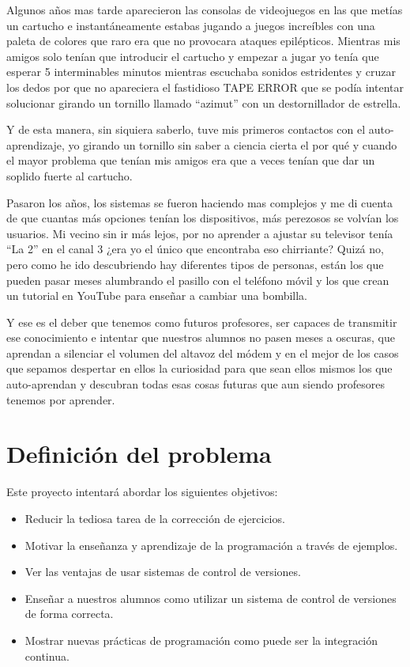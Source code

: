 \bigskip
Algunos años mas tarde aparecieron las consolas de videojuegos en las que metías un cartucho e instantáneamente estabas jugando a juegos increíbles con una paleta de colores que raro era que no provocara ataques epilépticos. Mientras mis amigos solo tenían que introducir el cartucho y empezar a jugar yo tenía que esperar 5 interminables minutos mientras escuchaba sonidos estridentes y cruzar los dedos por que no apareciera el fastidioso TAPE ERROR que se podía intentar solucionar girando un tornillo llamado ``azimut'' con un destornillador de estrella.

\bigskip
Y de esta manera, sin siquiera saberlo, tuve mis primeros contactos con el auto-aprendizaje, yo girando un tornillo sin saber a ciencia cierta el por qué y cuando el mayor problema que tenían mis amigos era que a veces tenían que dar un soplido fuerte al cartucho.

\bigskip
Pasaron los años, los sistemas se fueron haciendo mas complejos y me di cuenta de que cuantas más opciones tenían los dispositivos, más perezosos se volvían los usuarios. Mi vecino sin ir más lejos, por no aprender a ajustar su televisor tenía ``La 2'' en el canal 3 ¿era yo el único que encontraba eso chirriante? Quizá no, pero como he ido descubriendo hay diferentes tipos de personas, están los que pueden pasar meses alumbrando el pasillo con el teléfono móvil y los que crean un tutorial en YouTube para enseñar a cambiar una bombilla.

\bigskip
Y ese es el deber que tenemos como futuros profesores, ser capaces de transmitir ese conocimiento e intentar que nuestros alumnos no pasen meses a oscuras, que aprendan a silenciar el volumen del altavoz del módem y en el mejor de los casos que sepamos despertar en ellos la curiosidad para que sean ellos mismos los que auto-aprendan y descubran todas esas cosas futuras que aun siendo profesores tenemos por aprender.

\section{Definición del problema}

Este proyecto intentará abordar los siguientes objetivos:

\begin{itemize}
  \item Reducir la tediosa tarea de la corrección de ejercicios.
  \item Motivar la enseñanza y aprendizaje de la programación a través de ejemplos.
  \item Ver las ventajas de usar sistemas de control de versiones.
  \item Enseñar a nuestros alumnos como utilizar un sistema de control de versiones de forma correcta.
  \item Mostrar nuevas prácticas de programación como puede ser la integración continua.
\end{itemize}

